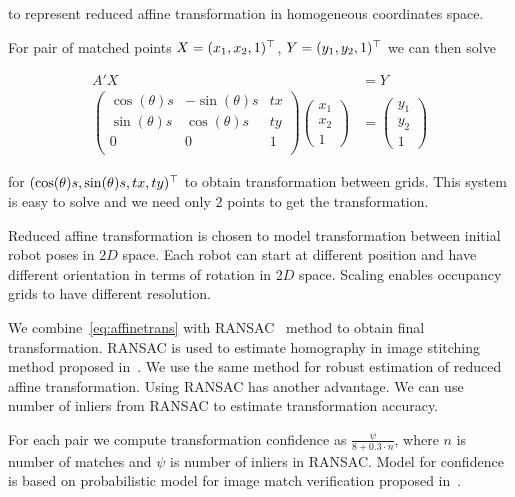 to represent reduced affine transformation in homogeneous coordinates space.

For pair of matched points $X=(x_1,x_2,1)^\top$, $Y=(y_1, y_2, 1)^\top$ we can then solve

\begin{align}
    A'X &= Y \label{eq:affinetrans}\\
    \begin{pmatrix}
        \cos(\theta)s & -\sin(\theta)s & tx \\
        \sin(\theta)s & \cos(\theta)s & ty \\
        0 & 0 & 1 \\
    \end{pmatrix}
    \begin{pmatrix}
        x_1 \\
        x_2 \\
        1
    \end{pmatrix}
    &=
    \begin{pmatrix}
        y_1 \\
        y_2 \\
        1
    \end{pmatrix}
\end{align}

for $(\cos(\theta)s, \sin(\theta)s, tx, ty)^\top$ to obtain transformation between grids. This system is easy to solve and we need only $2$ points to get the transformation.

Reduced affine transformation is chosen to model transformation between initial robot poses in $2D$ space. Each robot can start at different position and have different orientation in terms of rotation in $2D$ space. Scaling enables occupancy grids to have different resolution.

We combine~\eqref{eq:affinetrans} with \gls{RANSAC}~\cite{fischler1981random} method to obtain final transformation. \gls{RANSAC} is used to estimate homography in image stitching method proposed in~\cite{Brown2006}. We use the same method for robust estimation of reduced affine transformation. Using \gls{RANSAC} has another advantage. We can use number of inliers from \gls{RANSAC} to estimate transformation accuracy.

For each pair we compute transformation confidence as $\frac{\psi}{8 + 0.3 \cdot n}$, where $n$ is number of matches and $\psi$ is number of inliers in \gls{RANSAC}. Model for confidence is based on probabilistic model for image match verification proposed in~\cite{Brown2006}.

